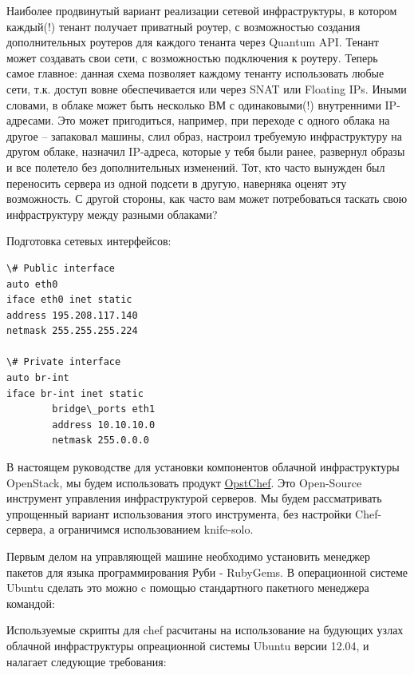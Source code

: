 \documentclass[letterpaper,10pt,russian]{sphinxmanual}
\begin{document}
Наиболее продвинутый вариант реализации сетевой инфраструктуры, в котором каждый(!) тенант получает приватный роутер, с возможностью создания дополнительных роутеров для каждого тенанта через Quantum API. Тенант может создавать свои сети, с возможностью подключения к роутеру. Теперь самое главное: данная схема позволяет каждому тенанту использовать любые сети, т.к. доступ вовне обеспечивается или через SNAT или Floating IPs. Иными словами, в облаке может быть несколько ВМ с одинаковыми(!) внутренними IP-адресами. Это может пригодиться, например, при переходе с одного облака на другое – запаковал машины, слил образ, настроил требуемую инфраструктуру на другом облаке, назначил IP-адреса, которые у тебя были ранее, развернул образы и все полетело без дополнительных изменений. Тот, кто часто вынужден был переносить сервера из одной подсети в другую, наверняка оценят эту возможность. С другой стороны, как часто вам может потребоваться таскать свою инфраструктуру между разными облаками?

Подготовка сетевых интерфейсов:

\begin{Verbatim}[commandchars=\\\{\}]
\# Public interface
auto eth0
iface eth0 inet static
address 195.208.117.140
netmask 255.255.255.224

\# Private interface
auto br-int
iface br-int inet static
        bridge\_ports eth1
        address 10.10.10.0
        netmask 255.0.0.0
\end{Verbatim}

В настоящем руководстве для установки компонентов облачной инфраструктуры OpenStack, мы будем использовать продукт \href{http://www.opst.com/chef}{OpstChef}. Это Open-Source инструмент управления инфраструктурой серверов. Мы будем рассматривать упрощенный вариант использования этого инструмента, без настройки Chef-сервера, а ограничимся использованием knife-solo.

Первым делом на управляющей машине необходимо установить менеджер пакетов для языка программирования Руби - RubyGems. В операционной системе Ubuntu сделать это можно c помощью стандартного пакетного менеджера командой:




Используемые скрипты для chef расчитаны на использование на будующих узлах облачной инфраструктуры опреационной системы Ubuntu версии 12.04, и налагает следующие требования:
\end{document}
